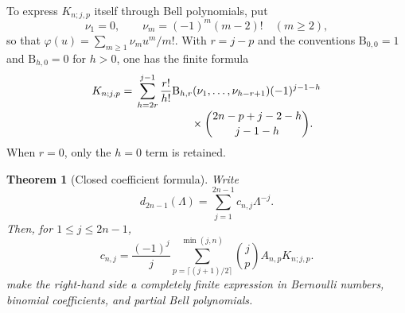 \documentclass[11pt,a4paper,oneside]{article}
\theoremstyle{plain}
\newtheorem{theorem}{Theorem}[section]
\theoremstyle{definition}
\theoremstyle{remark}
\newcommand{\BellP}[2]{\mathrm B_{#1,#2}}
\begin{document}
To express $K_{n;j,p}$ itself through Bell polynomials, put
\begin{equation}
 \nu_1=0,
 \qquad \nu_m=(-1)^m(m-2)!\quad(m\ge2),
 \label{eq:nu-def}
\end{equation}
so that $\varphi(u)=\sum_{m\ge1}\nu_mu^m/m!$.  With
$r=j-p$ and the conventions $\BellP{0}{0}=1$ and
$\BellP{h}{0}=0$ for $h>0$, one has the finite formula
\begin{align}
 K_{n;j,p}={}&
 \sum_{h=2r}^{j-1}
 \frac{r!}{h!}\BellP{h}{r}(\nu_1,\ldots,\nu_{h-r+1})
 (-1)^{j-1-h}
 \notag\\[-0.2em]
 &\hspace{5em}{}\times
 \binom{2n-p+j-2-h}{j-1-h}.
 \label{eq:K-bell}
\end{align}
When $r=0$, only the $h=0$ term is retained.

\begin{theorem}[Closed coefficient formula]
\label{thm:closed-coefficients}
Write
\begin{equation}
 d_{2n-1}(\Lambda)=\sum_{j=1}^{2n-1}c_{n,j}\Lambda^{-j}.
 \label{eq:c-nj-expansion}
\end{equation}
Then, for $1\le j\le2n-1$,
\begin{equation}
 \boxed{
 c_{n,j}=\frac{(-1)^j}{j}
 \sum_{p=\lceil(j+1)/2\rceil}^{\min(j,n)}
 \binom{j}{p}A_{n,p}K_{n;j,p}.}
 \label{eq:closed-c-nj}
\end{equation}
 make the right-hand side a completely
finite expression in Bernoulli numbers, binomial coefficients, and partial
Bell polynomials.
\end{theorem}
\end{document}
